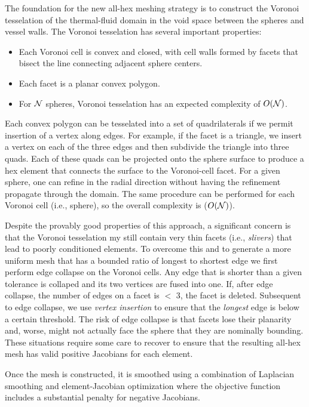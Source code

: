The foundation for the new all-hex meshing strategy is to construct
the Voronoi tesselation of the thermal-fluid domain in the void space
between the spheres and vessel walls.  The Voronoi tesselation has
several important properties:
\begin{itemize}
  \item Each Voronoi cell is convex and closed, with cell walls formed
        by facets that bisect the line connecting adjacent sphere centers.
  \item Each facet is a planar convex polygon.
  \item For $\cal N$ spheres, Voronoi tesselation has an expected 
        complexity of $O(\cal N)$.  
\end{itemize}
Each convex polygon can be tesselated into a set of quadrilaterals
if we permit insertion of a vertex along edges.  For example, if the
facet is a triangle, we insert a vertex on each of the three
edges and then subdivide the triangle into three quads.  Each of these
quads can be projected onto the sphere surface to produce a hex element
that connects the surface to the Voronoi-cell facet.  For a given
sphere, one can refine in the radial direction without having the
refinement propagate through the domain.  The same procedure
can be performed for each Voronoi cell (i.e., sphere), so the 
overall complexity is ($O(\cal N)$).

Despite the provably good properties of this approach, a significant concern is
that the Voronoi tesselation my still contain very thin facets (i.e., {\em
slivers}) that lead to poorly conditioned elements.  To overcome this and to
generate a more uniform mesh that has a bounded ratio of longest to shortest
edge we first perform edge collapse on the Voronoi cells.  Any edge that is
shorter than a given tolerance is collaped and its two vertices are fused into
one.  If, after edge collapse, the number of edges on a facet is $<$ 3, the
facet is deleted.   Subsequent to edge collapse, we use {\em vertex insertion}
to ensure that the {\em longest} edge is below a certain threshold.
The risk of edge collapse is that facets lose their planarity and, worse,
might not actually face the sphere that they are nominally bounding.
These situations require some care to recover to ensure that the 
resulting all-hex mesh has valid positive Jacobians for each element.

Once the mesh is constructed, it is smoothed using a combination of Laplacian
smoothing and element-Jacobian optimization where the objective function
includes a substantial penalty for negative Jacobians.






